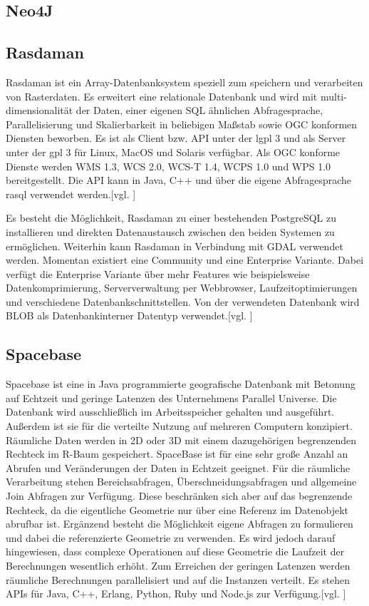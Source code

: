 \subsection{Neo4J}

\newpage

\subsection{Rasdaman}

Rasdaman ist ein Array-Datenbanksystem speziell zum speichern und verarbeiten von Rasterdaten.
Es erweitert eine relationale Datenbank und wird mit  multi-dimensionalität der Daten, einer eigenen SQL ähnlichen Abfragesprache, Parallelisierung und Skalierbarkeit in beliebigen Maßstab sowie OGC konformen Diensten beworben.
Es ist als Client bzw. API unter der \Gls{lgpl} 3 und als Server unter der \Gls{gpl} 3 für Linux, MacOS und Solaris verfügbar.
Als OGC konforme Dienste werden WMS 1.3, WCS 2.0, WCS-T 1.4, WCPS 1.0 und WPS 1.0 bereitgestellt.
Die API kann in Java, C++ und über die eigene Abfragesprache rasql verwendet werden.[vgl. \cite{website:rasdamanogeo}]

Es besteht die Möglichkeit, Rasdaman zu einer bestehenden PostgreSQL zu installieren und direkten Datenaustausch zwischen den beiden Systemen zu ermöglichen.
Weiterhin kann Rasdaman in Verbindung mit GDAL verwendet werden.
Momentan existiert eine Community und eine Enterprise Variante. Dabei verfügt die Enterprise Variante über mehr Features wie beispielsweise Datenkomprimierung, Serververwaltung per Webbrowser, Laufzeitoptimierungen und verschiedene Datenbankschnittstellen.
Von der verwendeten Datenbank wird BLOB als Datenbankinterner Datentyp verwendet.[vgl. \cite{website:rasdamanowiki}]


\subsection{Spacebase}

Spacebase ist eine in Java programmierte geografische Datenbank mit Betonung auf Echtzeit und geringe Latenzen des Unternehmens Parallel Universe.
Die Datenbank wird ausschließlich im Arbeitsspeicher gehalten und ausgeführt.
Außerdem ist sie für die verteilte Nutzung auf mehreren Computern konzipiert.
Räumliche Daten werden in 2D oder 3D mit einem dazugehörigen begrenzenden Rechteck im R-Baum gespeichert.
SpaceBase ist für eine sehr große Anzahl an Abrufen und Veränderungen der Daten in Echtzeit geeignet.
Für die räumliche Verarbeitung stehen Bereichsabfragen, Überschneidungsabfragen und allgemeine Join Abfragen zur Verfügung.
Diese beschränken sich aber auf das begrenzende Rechteck, da die eigentliche Geometrie nur über eine Referenz im Datenobjekt abrufbar ist.
Ergänzend besteht die Möglichkeit eigene Abfragen zu formulieren und dabei die referenzierte Geometrie zu verwenden.
Es wird jedoch darauf hingewiesen, dass complexe Operationen auf diese Geometrie die Laufzeit der Berechnungen wesentlich erhöht.
Zum Erreichen der geringen Latenzen werden räumliche Berechnungen parallelisiert und auf die Instanzen verteilt.
Es stehen APIs für Java, C++, Erlang, Python, Ruby und Node.js zur Verfügung.[vgl. \cite{website:spacebase}]

